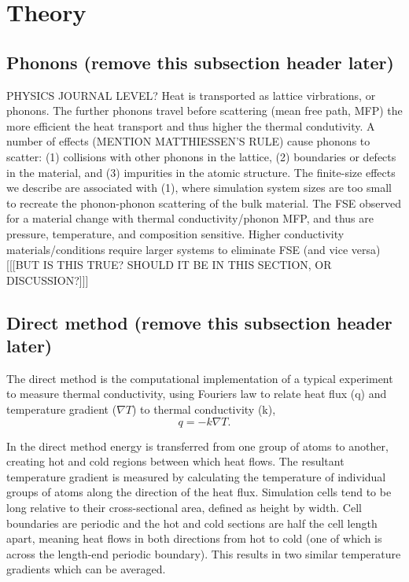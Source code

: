 \documentclass[%
preprint,                                  %
nofootinbib,
 amsmath,amssymb,
 aps,
]{revtex4-1}
\begin{document}
\section{\label{sec:theory}Theory}

\subsection{\label{sec:theory.phon}Phonons (remove this subsection header later)}

PHYSICS JOURNAL LEVEL? 
Heat is transported as lattice virbrations, or phonons. The further phonons travel before scattering (mean free path, MFP) the more efficient the heat transport and thus higher the thermal condutivity. A number of effects (MENTION MATTHIESSEN'S RULE) cause phonons to scatter: (1) collisions with other phonons in the lattice, (2) boundaries or defects in the material, and (3) impurities in the atomic structure. The finite-size effects we describe are associated with (1), where simulation system sizes are too small to recreate the phonon-phonon scattering of the bulk material. The FSE observed for a material change with thermal conductivity/phonon MFP, and thus are pressure, temperature, and composition sensitive. Higher conductivity materials/conditions require larger systems to eliminate FSE (and vice versa) [[[BUT IS THIS TRUE? SHOULD IT BE IN THIS SECTION, OR DISCUSSION?]]]




\subsection{\label{sec:theory.direct}Direct method (remove this subsection header later)}

The direct method is the computational implementation of a typical experiment to measure thermal conductivity, using Fourier\textsc{}s law to relate heat flux (q) and temperature gradient ($\nabla{T}$) to thermal conductivity (k), 
\begin{equation}
q=-k \nabla{T} \label{fourier}.
\end{equation}

In the direct method energy is transferred from one group of atoms to another, creating hot and cold regions between which heat flows. The resultant temperature gradient is measured by calculating the temperature of individual groups of atoms along the direction of the heat flux. Simulation cells tend to be long relative to their cross-sectional area, defined as height by width. %
Cell boundaries are periodic and the hot and cold sections are half the cell length apart, meaning heat flows in both directions from hot to cold (one of which is across the length-end periodic boundary). This results in two similar temperature gradients which can be averaged.
\end{document}
